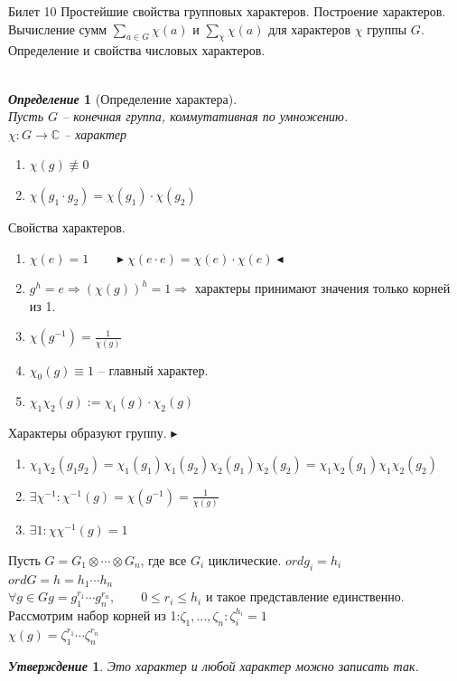 \documentclass[a4paper,12pt]{article}
\newtheorem{deff}{\textit{Определение}}
\newtheorem{utv}{\textit{Утверждение}}
\newcommand{\ee}{\equiv}
\newcommand{\q}{\quad}
\newcommand{\pb}{\blacktriangleright}
\newcommand{\pe}{\blacktriangleleft}
\newcommand{\Ra}{\Rightarrow}
\newcommand{\bb}[1]{\mathbb{#1}}
\begin{document}
\newpage
\begin{mybox}{\hypertarget{bil10}{Билет 10}}
Простейшие свойства групповых характеров. Построение характеров. Вычисление сумм $\sum_{a\in G} \chi(a)$ и $\sum_\chi \chi(a)$ для характеров $\chi$ группы $G$. Определение и свойства числовых характеров.\\\q\\
\begin{deff} [Определение характера]\q\\
Пусть $G$ -- конечная группа, коммутативная по умножению.\\
$\chi:G\to\bb{C}$ -- характер
\begin{enumerate}
\item $\chi(g) \not\ee0 $
\item $\chi(g_1 \cdot g_2) = \chi(g_1)\cdot \chi(g_2)  $
\end{enumerate}
\end{deff}
Свойства характеров.
\begin{enumerate}
\item $\chi(e) = 1\q\q \pb \chi(e\cdot e) = \chi(e)\cdot \chi(e) \pe$
\item $g^h=e\Ra (\chi(g))^h = 1 \Ra $ характеры принимают значения только корней из 1.
\item $\chi(g^{-1}) = \frac{1}{\chi(g)}$
\item $\chi_0(g)\ee 1$ -- главный характер.
\item $\chi_1 \chi_2 (g):= \chi_1(g)\cdot\chi_2(g)$
\end{enumerate}
Характеры образуют группу.
$\pb$
\begin{enumerate}
\item $\chi_1\chi_2 (g_1 g_2) = \chi_1(g_1)\chi_1(g_2)\chi_2(g_1)\chi_2(g_2) = \chi_1\chi_2(g_1)\chi_1\chi_2(g_2)$
\item $\exists \chi^{-1}: \chi^{-1}(g) =\chi(g^{-1}) = \frac{1}{\chi(g)}$
\item $\exists 1: \chi\chi^{-1}(g) = 1$
\end{enumerate}
Пусть $G = G_1\otimes \cdots \otimes G_n$, где все $G_i$ циклические. $ord g_i = h_i$\\
$ord G = h = h_1\cdots h_n$\\
$\forall g\in G g = g_1^{r_1}\cdots g_n^{r_n},\q\q 0\le r_i\le h_i$ и такое представление единственно.\\
Рассмотрим набор корней из 1:$\zeta_1,\dots,\zeta_n: \zeta_i^{h_i} = 1$\\
$\chi(g) = \zeta_1^{r_1}\cdots \zeta_n^{r_n}$
\begin{utv} Это характер и любой характер можно записать так.

\end{utv}
\end{mybox}
\end{document}
